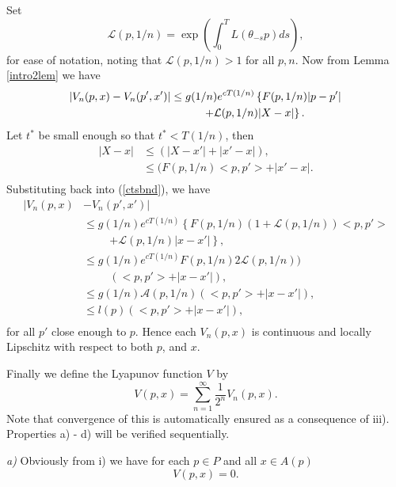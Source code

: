 \begin{prf}
  Set
  \[ \mathcal{L}(p, 1/n) = \exp \left( \int_0^T L(\theta_{-s} p) ds \right), \]
  for ease of notation, noting that $\mathcal{L}(p, 1/n) > 1$ for all $p, n$.
  Now from Lemma \ref{intro2lem} we have
  \begin{align}
  \label{ctsbnd}
  |V_n(p, x) - V_n( p',x')| &\leq g(1/n) e^{cT(1/n)} \left\{ F(p, 1/n) |p-p'|
    \right. \notag \\
  &\hspace{1cm} \left. + \mathcal{L}(p, 1/n) |X - x| \right\}.
  \end{align}
  Let $t^*$ be small enough so that $t^* < T(1/n)$, then
  \begin{align*}
  |X - x| &\leq (|X - x'| + |x' - x|), \\
  &\leq (F(p, 1/n)<p, p'> + |x' - x|. \\
  \end{align*}
  Substituting back into (\ref{ctsbnd}), we have
  \begin{align*}
  |V_n(p, x) & - V_n( p',x')| \\
   & \leq g(1/n) e^{cT(1/n)} \left\{ F(p, 1/n) \right.
             (1 + \mathcal{L}(p, 1/n))<p, p'> \\
   & \hspace{1cm} \left. + \mathcal{L} (p, 1/n)|x - x'| \right\}, \\
  &\leq g(1/n) e^{cT(1/n)} F(p, 1/n) 2 \mathcal{L}(p, 1/n)) \\
  &\hspace{1cm} (<p, p'> + |x - x'|), \\
  &\leq g(1/n) \mathcal{A}(p, 1/n) (<p, p'> + |x - x'|), \\
  &\leq l(p) (<p, p'> + |x - x'|), \\
  \end{align*}
  for all $p'$ close enough to $p$.  Hence each $V_n(p, x)$ is continuous and
  locally Lipschitz with respect to both $p$, and $x$.

  Finally we define the Lyapunov function $V$ by
  \[ V(p, x) = \sum_{n=1}^{\infty} \frac{1}{2^n} V_n(p, x). \]
  Note that convergence of this is automatically ensured as a consequence of
  iii). Properties a) - d) will be verified sequentially.

  {\em a)} Obviously from i) we have for each $p \in P$ and all $x \in A(p)$
  \[ V(p, x) = 0. \]


\end{prf}
